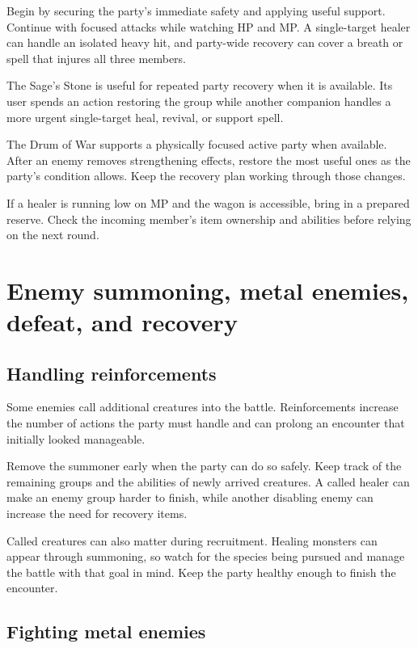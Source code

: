 Begin by securing the party's immediate safety and applying useful
support. Continue with focused attacks while watching HP and MP. A
single-target healer can handle an isolated heavy hit, and party-wide
recovery can cover a breath or spell that injures all three members.

The Sage's Stone is useful for repeated party recovery when it is
available. Its user spends an action restoring the group while another
companion handles a more urgent single-target heal, revival, or support
spell.

The Drum of War supports a physically focused active party when available.
After an enemy removes strengthening effects, restore the most useful
ones as the party's condition allows. Keep the recovery plan working
through those changes.

If a healer is running low on MP and the wagon is accessible, bring in
a prepared reserve. Check the incoming member's item ownership and
abilities before relying on the next round.

\section{Enemy summoning, metal enemies, defeat, and recovery}

\subsection*{Handling reinforcements}

Some enemies call additional creatures into the battle. Reinforcements
increase the number of actions the party must handle and can prolong
an encounter that initially looked manageable.

Remove the summoner early when the party can do so safely. Keep track
of the remaining groups and the abilities of newly arrived creatures.
A called healer can make an enemy group harder to finish, while another
disabling enemy can increase the need for recovery items.

Called creatures can also matter during recruitment. Healing monsters
can appear through summoning, so watch for the species being pursued
and manage the battle with that goal in mind. Keep the party healthy
enough to finish the encounter.

\subsection*{Fighting metal enemies}

